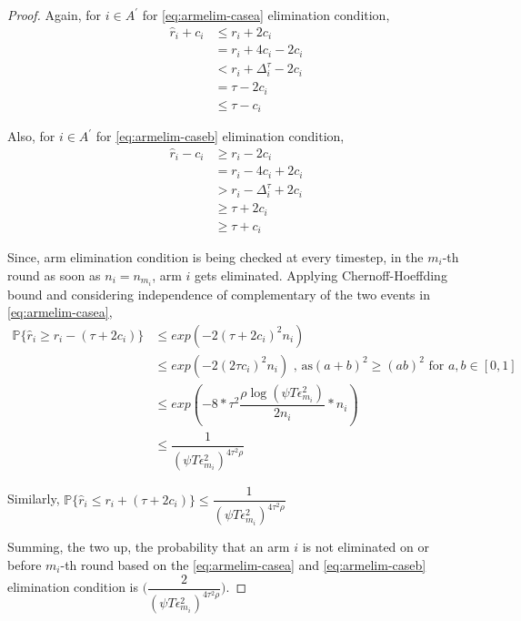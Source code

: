 \begin{proof}
Again, for ${i} \in A^{'}$ for \ref{eq:armelim-casea} elimination condition, 
\begin{align*}
\hat{r}_{i} + c_{i}&\leq r_{i} + 2c_{i} \\
&= r_{i} + 4c_{i} - 2c_{i} \\
&< r_{i} + \Delta_{i}^{\tau} - 2c_{i}\\
&= \tau -2c_{i} \\
&\leq \tau - c_{i}
\end{align*}

Also, for ${i} \in A^{'}$ for \ref{eq:armelim-caseb} elimination condition, 
\begin{align*}
\hat{r}_{i} - c_{i}&\geq r_{i} - 2c_{i} \\
&= r_{i} - 4c_{i} + 2c_{i} \\
&> r_{i} - \Delta_{i}^{\tau} + 2c_{i}\\
&\geq \tau + 2c_{i} \\
&\geq \tau + c_{i}
\end{align*}

Since, arm elimination condition is being checked at every timestep, in the $m_{i}$-th round as soon as $n_{i}=n_{m_{i}}$, arm $i$ gets eliminated. Applying Chernoff-Hoeffding bound and considering independence of complementary of the two events in \ref{eq:armelim-casea},
  \begin{align*}
\mathbb{P}\lbrace\hat{r}_{i}\geq r_{i} - (\tau + 2c_{i})\rbrace &\leq exp(-2(\tau + 2c_{i})^{2}n_{i})\\
&\leq exp(-2(2\tau c_{i})^{2}n_{i}) \text{ , as} (a+b)^{2} \geq (ab)^{2} \text{ for } a,b\in[0,1]\\
&\leq exp(-8 * \tau^{2}\dfrac{\rho\log (\psi T\epsilon_{m_{i}}^{2})}{2 n_{i}} *n_{i})\\
&\leq \dfrac{1}{(\psi T\epsilon_{m_{i}}^{2})^{4\tau^{2}\rho}}   
  \end{align*}
  
Similarly, $\mathbb{P}\lbrace\hat{r}_{i}\leq r_{i} + (\tau + 2c_{i})\rbrace\leq \dfrac{1}{(\psi  T\epsilon_{m_{i}}^{2})^{4\tau^{2}\rho}}$
 
Summing, the two up, the probability that an arm ${i}$ is not eliminated on or before $m_{i}$-th round based on the \ref{eq:armelim-casea} and \ref{eq:armelim-caseb} elimination condition is  $\bigg(\dfrac{2}{(\psi T\epsilon_{m_{i}}^{2})^{4\tau^{2}\rho}}\bigg)$. 

%


\end{proof}
